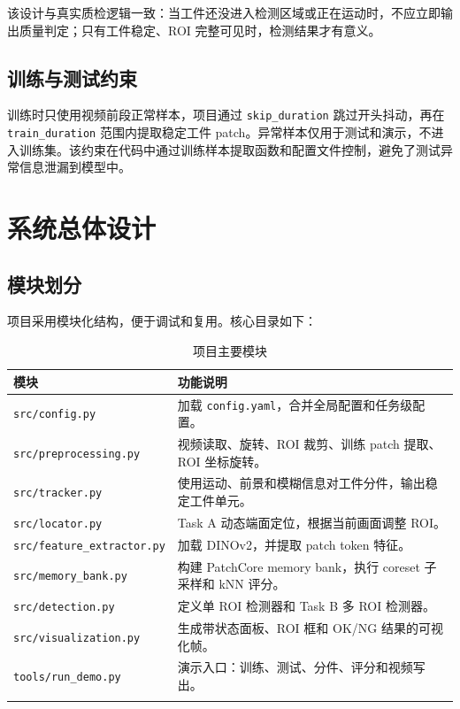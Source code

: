 \documentclass[12pt,hyperref,a4paper,UTF8,fontset=fandol]{ctexart}
\begin{document}
该设计与真实质检逻辑一致：当工件还没进入检测区域或正在运动时，不应立即输出质量判定；只有工件稳定、ROI 完整可见时，检测结果才有意义。

\subsection{训练与测试约束}

训练时只使用视频前段正常样本，项目通过 \texttt{skip\_duration} 跳过开头抖动，再在 \texttt{train\_duration} 范围内提取稳定工件 patch。异常样本仅用于测试和演示，不进入训练集。该约束在代码中通过训练样本提取函数和配置文件控制，避免了测试异常信息泄漏到模型中。

\newpage
\section{系统总体设计}

\subsection{模块划分}

项目采用模块化结构，便于调试和复用。核心目录如下：

\begin{longtable}{p{}p{}}
\toprule
模块 & 功能说明 \\
\midrule
\texttt{src/config.py} & 加载 \texttt{config.yaml}，合并全局配置和任务级配置。 \\
\texttt{src/preprocessing.py} & 视频读取、旋转、ROI 裁剪、训练 patch 提取、ROI 坐标旋转。 \\
\texttt{src/tracker.py} & 使用运动、前景和模糊信息对工件分件，输出稳定工件单元。 \\
\texttt{src/locator.py} & Task A 动态端面定位，根据当前画面调整 ROI。 \\
\texttt{src/feature\_extractor.py} & 加载 DINOv2，并提取 patch token 特征。 \\
\texttt{src/memory\_bank.py} & 构建 PatchCore memory bank，执行 coreset 子采样和 kNN 评分。 \\
\texttt{src/detection.py} & 定义单 ROI 检测器和 Task B 多 ROI 检测器。 \\
\texttt{src/visualization.py} & 生成带状态面板、ROI 框和 OK/NG 结果的可视化帧。 \\
\texttt{tools/run\_demo.py} & 演示入口：训练、测试、分件、评分和视频写出。 \\
\bottomrule
\caption{项目主要模块}
\end{longtable}
\end{document}
